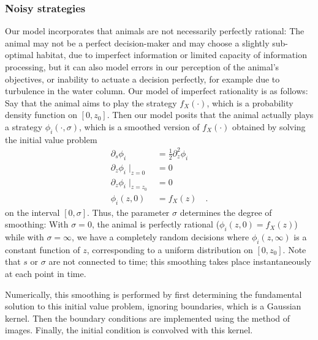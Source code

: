 \subsubsection{Noisy strategies}
Our model incorporates that animals are not necessarily perfectly rational: The animal may not be a perfect decision-maker and may choose a slightly sub-optimal habitat, due to imperfect information or limited capacity of information processing, but it can also model errors in our perception of the animal's objectives, or inability to actuate a decision perfectly, for example due to turbulence in the water column. Our model of imperfect rationality is as follows: Say that the animal aims to play the strategy $f_X(\cdot)$, which is a probability density function on $[0,z_0]$. Then our model posits that the animal actually plays a strategy $\phi_i(\cdot ,\sigma)$, which is a smoothed version of $f_X(\cdot)$ obtained by solving the initial value problem
\begin{equation}
  \begin{split}
  \label{eq:density_PDE}
  \partial_s \phi_i &= \frac{1}{2}\partial_z^2 \phi_i \\
  \partial_z \phi_i \mid_{z=0} &= 0 \\
  \partial_z \phi_i \mid_{z = z_0} &= 0 \\
   \phi_i(z,0) &= f_X(z) \quad .
 \end{split}
\end{equation}
on the interval $[0,\sigma]$. Thus, the parameter $\sigma$ determines the degree of smoothing: With $\sigma=0$, the animal is perfectly rational ($\phi_i(z,0)=f_X(z)$) while with $\sigma=\infty$, we have a completely random decisions where $\phi_i(z,\infty)$ is a constant function of $z$, corresponding to a uniform distribution on $[0,z_0]$. Note that $s$ or $\sigma$ are not connected to time; this smoothing takes place instantaneously at each point in time.

Numerically, this smoothing is performed by first determining the fundamental solution to this initial value problem, ignoring boundaries, which is a Gaussian kernel. Then the boundary conditions are implemented using the method of images. Finally, the initial condition is convolved with this kernel.


